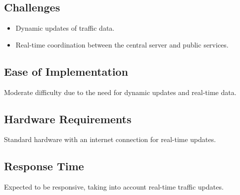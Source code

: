 \documentclass[a4paper, 12pt]{article}
\begin{document}
	\subsection*{Challenges}
	\begin{itemize}
		\item Dynamic updates of traffic data.
		\item Real-time coordination between the central server and public services.
	\end{itemize}
	
	\subsection*{Ease of Implementation}
	Moderate difficulty due to the need for dynamic updates and real-time data.
	
	\subsection*{Hardware Requirements}
	Standard hardware with an internet connection for real-time updates.
	
	\subsection*{Response Time}
	Expected to be responsive, taking into account real-time traffic updates.
	
	
	
	
	
	
	
	
	
\end{document}
